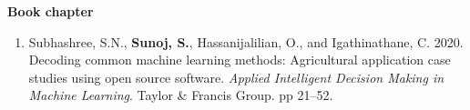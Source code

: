 \documentclass[11pt]{article}
\begin{document}
\textbf{Book chapter}\\
\begin{enumerate}[itemsep=-2pt]

\item Subhashree, S.N., \textbf{Sunoj, S.}, Hassanijalilian, O., and  Igathinathane, C. 2020. Decoding common machine learning methods: Agricultural application case studies using open source software. \textit{Applied Intelligent Decision Making in Machine Learning}. Taylor \& Francis Group. pp 21--52.  \\

\end{enumerate}
%
%
%
%


\end{document}
